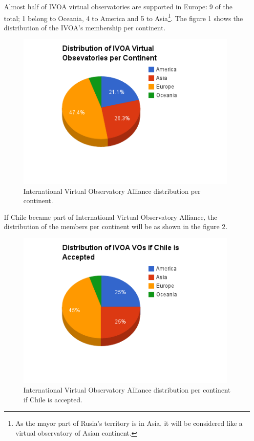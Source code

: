 Almost half of IVOA virtual observatories are supported in Europe: 9 of the
total; 1 belong to Oceania, 4 to America and 5 to Asia\footnote{As the mayor
part of Rusia's territory is in Asia, it will be considered like a virtual
observatory of Asian continent.}. The figure 1 shows the distribution of the
IVOA's membership per continent.\\

\begin{figure}%
\begin{center}
	\includegraphics[width=110mm]{img/vo_distribution.png}
	\caption{International Virtual Observatory Alliance distribution per
             continent.}
\end{center}
\end{figure}

If Chile became part of International Virtual Observatory Alliance, the
distribution of the members per continent will be as shown in the figure 2.\\

\begin{figure}%
\begin{center}
	\includegraphics[width=110mm]{img/if_chile.png}
	\caption{International Virtual Observatory Alliance distribution per
             continent if Chile is accepted.}
\end{center}
\end{figure}

